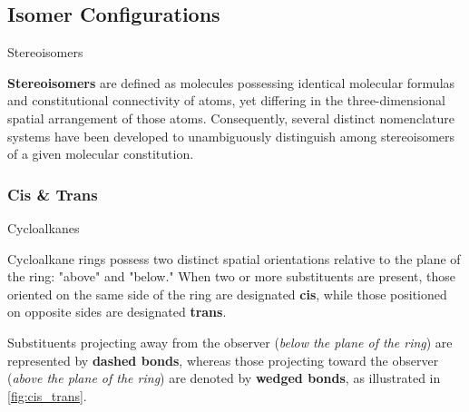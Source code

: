 \documentclass[10pt]{article}
\begin{document}
  \subsection{Isomer Configurations}

    \begin{core}{Stereoisomers}

      \textbf{Stereoisomers} are defined as molecules possessing identical molecular formulas and constitutional connectivity of atoms, yet differing in the three-dimensional spatial arrangement of those atoms. Consequently, several distinct nomenclature systems have been developed to unambiguously distinguish among stereoisomers of a given molecular constitution.

    \end{core}

    \subsubsection{Cis \& Trans}

      \begin{core}[label=core:cis_trans_cycloalkanes]{Cycloalkanes}

        Cycloalkane rings possess two distinct spatial orientations relative to the plane of the ring: "above" and "below." When two or more substituents are present, those oriented on the same side of the ring are designated \textbf{cis}, while those positioned on opposite sides are designated \textbf{trans}.


        Substituents projecting away from the observer (\textit{below the plane of the ring}) are represented by \textbf{dashed bonds}, whereas those projecting toward the observer (\textit{above the plane of the ring}) are denoted by \textbf{wedged bonds}, as illustrated in \autoref{fig:cis_trans}.

      \end{core}
\end{document}
